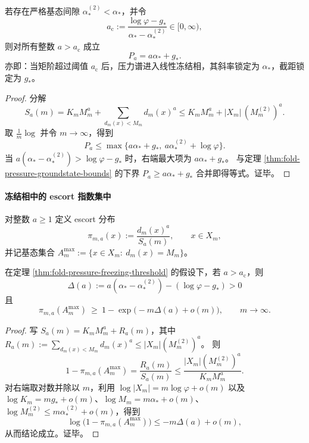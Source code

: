\begin{theorem}[冻结阈值与高阶线性化]\label{thm:fold-pressure-freezing-threshold}
若存在严格基态间隙 \(\alpha_*^{(2)}<\alpha_*\)，并令
\[
a_{\mathrm c}:=\frac{\log\varphi-g_*}{\alpha_*-\alpha_*^{(2)}}\in[0,\infty),
\]
则对所有整数 \(a>a_{\mathrm c}\) 成立
\[
P_a=a\alpha_*+g_*.
\]
亦即：当矩阶超过阈值 \(a_{\mathrm c}\) 后，压力谱进入线性冻结相，其斜率锁定为 \(\alpha_*\)，截距锁定为 \(g_*\)。
\end{theorem}

\begin{proof}
分解
\[
S_a(m)=K_m M_m^a+\sum_{d_m(x)<M_m} d_m(x)^a
\le K_m M_m^a+|X_m|\,(M_m^{(2)})^a.
\]
取 \(\frac1m\log\) 并令 \(m\to\infty\)，得到
\[
P_a\le \max\{a\alpha_*+g_*,\ a\alpha_*^{(2)}+\log\varphi\}.
\]
当 \(a(\alpha_*-\alpha_*^{(2)})>\log\varphi-g_*\) 时，右端最大项为 \(a\alpha_*+g_*\)。
与定理 \ref{thm:fold-pressure-groundstate-bounds} 的下界 \(P_a\ge a\alpha_*+g_*\) 合并即得等式。证毕。
\end{proof}

\paragraph{冻结相中的 escort 指数集中}
对整数 \(a\ge 1\) 定义 escort 分布
\[
\pi_{m,a}(x):=\frac{d_m(x)^a}{S_a(m)},\qquad x\in X_m,
\]
并记基态集合 \(A_m^{\max}:=\{x\in X_m:\ d_m(x)=M_m\}\)。

\begin{theorem}[基态质量的指数收敛]\label{thm:fold-escort-groundstate-concentration}
在定理 \ref{thm:fold-pressure-freezing-threshold} 的假设下，若 \(a>a_{\mathrm c}\)，则
\[
\Delta(a):=a(\alpha_*-\alpha_*^{(2)})-(\log\varphi-g_*)>0
\]
且
\[
\pi_{m,a}(A_m^{\max})\ \ge\ 1-\exp\!\bigl(-m\Delta(a)+o(m)\bigr),
\qquad m\to\infty.
\]
\end{theorem}

\begin{proof}
写 \(S_a(m)=K_mM_m^a+R_a(m)\)，其中
\(
R_a(m):=\sum_{d_m(x)<M_m} d_m(x)^a\le |X_m|(M_m^{(2)})^a
\)。
则
\[
1-\pi_{m,a}(A_m^{\max})
=\frac{R_a(m)}{S_a(m)}
\le \frac{|X_m|(M_m^{(2)})^a}{K_mM_m^a}.
\]
对右端取对数并除以 \(m\)，利用 \(\log|X_m|=m\log\varphi+o(m)\) 以及 \(\log K_m=mg_*+o(m)\)、\(\log M_m=m\alpha_*+o(m)\)、
\(\log M_m^{(2)}\le m\alpha_*^{(2)}+o(m)\)，得到
\[
\log\bigl(1-\pi_{m,a}(A_m^{\max})\bigr)
\le -m\Delta(a)+o(m),
\]
从而结论成立。证毕。
\end{proof}

